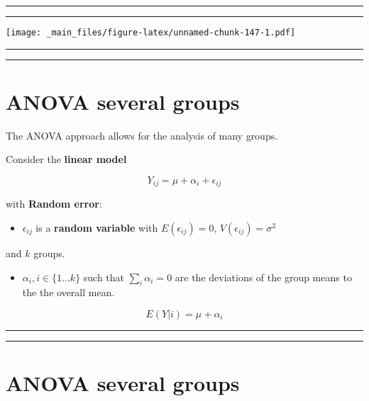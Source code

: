 \documentclass[
]{book}
\providecommand{\tightlist}{%
  \setlength{\itemsep}{0pt}\setlength{\parskip}{0pt}}
\begin{document}
\begin{center}\rule{0.5\linewidth}{0.5pt}\end{center}

\begin{center}\rule{0.5\linewidth}{0.5pt}\end{center}

\texttt{[image: \_main\_files/figure-latex/unnamed-chunk-147-1.pdf]}

\begin{center}\rule{0.5\linewidth}{0.5pt}\end{center}

\begin{center}\rule{0.5\linewidth}{0.5pt}\end{center}

\hypertarget{anova-several-groups}{%
\section{ANOVA several groups}\label{anova-several-groups}}

The ANOVA approach allows for the analysis of many groups.

Consider the \textbf{linear model}

\[Y_{ij} = \mu + \alpha_i +\epsilon_{ij}\]

with \textbf{Random error}:

\begin{itemize}
\tightlist
\item
  \(\epsilon_{ij}\) is a \textbf{random variable} with \(E(\epsilon_{ij})=0\), \(V(\epsilon_{ij})=\sigma^2\)
\end{itemize}

and \(k\) groups.

\begin{itemize}
\tightlist
\item
  \(\alpha_i, i \in\{1...k\}\) such that \(\sum_i \alpha_i=0\) are the deviations of the group means to the the overall mean.
\end{itemize}

\[E(Y|i)=\mu + \alpha_i\]

\begin{center}\rule{0.5\linewidth}{0.5pt}\end{center}

\begin{center}\rule{0.5\linewidth}{0.5pt}\end{center}

\hypertarget{anova-several-groups-1}{%
\section{ANOVA several groups}\label{anova-several-groups-1}}
\end{document}
